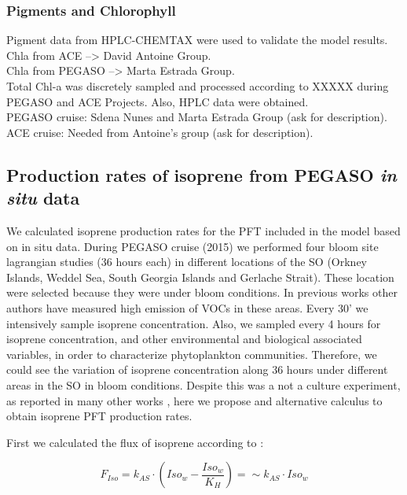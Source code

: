 \documentclass[draft,linenumbers]{agujournal}
\begin{document}
\subsubsection{Pigments and Chlorophyll}

Pigment data from HPLC-CHEMTAX were used to validate the model results.\\
Chla from ACE --> David Antoine Group.\\
Chla from PEGASO --> Marta Estrada Group.\\
Total Chl-a was discretely sampled and processed according to XXXXX during PEGASO and ACE Projects. Also, HPLC data were obtained.\\
PEGASO cruise: Sdena Nunes and Marta Estrada Group (ask for description).\\
ACE cruise: Needed from Antoine's group (ask for description).\\

\subsection{Production rates of isoprene from PEGASO \textit{in situ} data}

We calculated isoprene production rates for the PFT included in the model based on in situ data. During PEGASO cruise (2015) we performed four bloom site lagrangian studies (36 hours each) in different locations of the SO (Orkney Islands, Weddel Sea, South Georgia Islands and Gerlache Strait).
These location were selected because they were under bloom conditions.
In previous works \citep{meskhidze2006phytoplankton} other authors have measured high emission of VOCs in these areas.
Every 30' we intensively sample isoprene concentration. Also, we sampled every 4 hours for isoprene concentration, and other environmental and biological associated variables, in order to characterize phytoplankton communities.
Therefore, we could see the variation of isoprene concentration along 36 hours under different areas in the SO in bloom conditions.
Despite this was a not a culture experiment, as reported in many other works \citep{shaw2003isoprene,exton2013chlorophyll,booge2016can}, here we propose and alternative calculus to obtain isoprene PFT production rates.

First we calculated the flux of isoprene according to \citep{palmer2005quantifying}:\\

\begin{linenomath*}
\begin{equation}
F_{Iso} = k_{AS} \cdot (Iso_{w} - \frac{Iso_{w}}{K_{H}}) = ∼ k_{AS} \cdot Iso_{w}
\end{equation}
\end{linenomath*}
\end{document}
